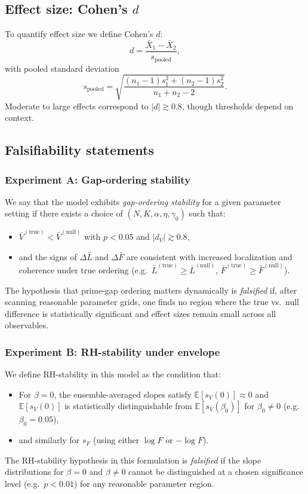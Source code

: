 \documentclass[11pt]{article}
\begin{document}
\subsection{Effect size: Cohen's $d$}

To quantify effect size we define Cohen's $d$:
\[
d = \frac{\bar X_1 - \bar X_2}{s_{\mathrm{pooled}}},
\]
with pooled standard deviation
\[
s_{\mathrm{pooled}} = \sqrt{\frac{(n_1-1)s_1^2 + (n_2-1)s_2^2}{n_1+n_2-2}}.
\]
Moderate to large effects correspond to $|d|\gtrsim 0.8$, though thresholds depend on context.

\subsection{Falsifiability statements}

\subsubsection{Experiment A: Gap-ordering stability}

We say that the model exhibits \emph{gap-ordering stability} for a given parameter setting if there exists a choice of $(N,K,\alpha,\eta,\gamma_0)$ such that:
\begin{itemize}
  \item $\bar V^{(\mathrm{true})} < \bar V^{(\mathrm{null})}$ with $p<0.05$ and $|d_V|\gtrsim0.8$,
  \item and the signs of $\Delta\bar L$ and $\Delta\bar F$ are consistent with increased localization and coherence under true ordering (e.g.\ $\bar L^{(\mathrm{true})}\ge\bar L^{(\mathrm{null})}$, $\bar F^{(\mathrm{true})}\ge\bar F^{(\mathrm{null})}$).
\end{itemize}
The hypothesis that prime-gap ordering matters dynamically is \emph{falsified} if, after scanning reasonable parameter grids, one finds no region where the true vs.\ null difference is statistically significant and effect sizes remain small across all observables.

\subsubsection{Experiment B: RH-stability under envelope}

We define RH-stability in this model as the condition that:
\begin{itemize}
  \item For $\beta=0$, the ensemble-averaged slopes satisfy $\mathbb{E}[s_V(0)]\approx 0$ and $\mathbb{E}[s_V(0)]$ is statistically distinguishable from $\mathbb{E}[s_V(\beta_0)]$ for $\beta_0\neq 0$ (e.g.\ $\beta_0=0.05$),
  \item and similarly for $s_F$ (using either $\log F$ or $-\log F$).
\end{itemize}
The RH-stability hypothesis in this formulation is \emph{falsified} if the slope distributions for $\beta=0$ and $\beta\neq 0$ cannot be distinguished at a chosen significance level (e.g.\ $p<0.01$) for any reasonable parameter region.
\end{document}
